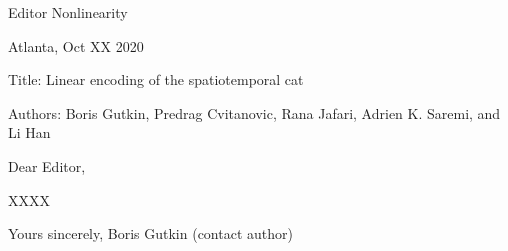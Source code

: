 
        Editor
        Nonlinearity

                                            Atlanta, Oct XX 2020

Title:
    Linear encoding of the spatiotemporal cat

Authors:
    Boris Gutkin,
    Predrag Cvitanovic,
    Rana Jafari,
    Adrien K. Saremi,
         and
    Li Han

Dear Editor,

XXXX

Yours sincerely,
   Boris Gutkin (contact author)
